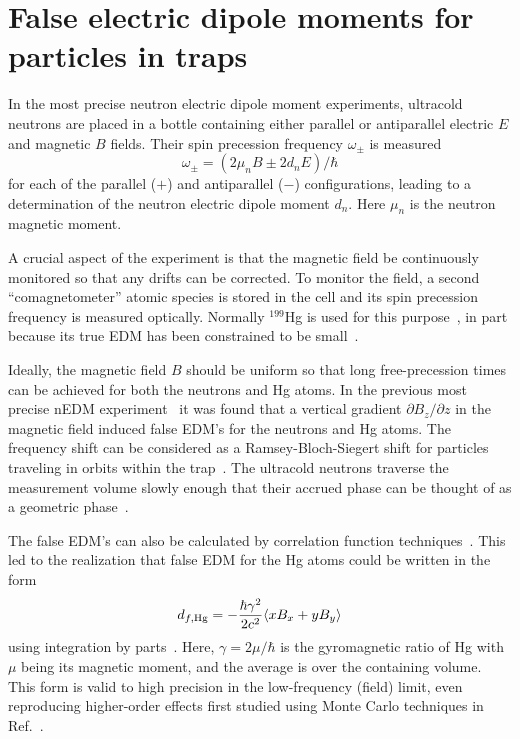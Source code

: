 \documentclass[preprint,12pt]{elsarticle}
\begin{document}

\section{False electric dipole moments for particles in traps}
\label{sec:intro}

In the most precise neutron electric dipole moment experiments,
ultracold neutrons are placed in a bottle containing either parallel
or antiparallel electric $E$ and magnetic $B$ fields.  Their spin
precession frequency $\omega_\pm$ is measured
\begin{equation}
\omega_\pm=(2\mu_nB\pm 2d_nE)/\hbar
\end{equation}
for each of the parallel ($+$) and antiparallel ($-$) configurations,
leading to a determination of the neutron electric dipole moment
$d_n$.  Here $\mu_n$ is the neutron magnetic moment.

A crucial aspect of the experiment is that the magnetic field be
continuously monitored so that any drifts can be corrected.  To
monitor the field, a second ``comagnetometer'' atomic species is
stored in the cell and its spin precession frequency is measured
optically.  Normally $^{199}$Hg is used for this
purpose~\cite{bib:green,bib:bakernim,bib:hg-better}, in part because
its true EDM has been constrained to be
small~\cite{bib:griffith,bib:hgupdate}.

Ideally, the magnetic field $B$ should be uniform so that long
free-precession times can be achieved for both the neutrons and Hg
atoms.  In the previous most precise nEDM
experiment~\cite{bib:baker,bib:pendlebury} it was found that a
vertical gradient $\partial B_z/\partial z$ in the magnetic field
induced false EDM's for the neutrons and Hg atoms.  The frequency
shift can be considered as a Ramsey-Bloch-Siegert shift for particles
traveling in orbits within the trap~\cite{bib:gpe1,bib:gpe2}.  The
ultracold neutrons traverse the measurement volume slowly enough that
their accrued phase can be thought of as a geometric
phase~\cite{bib:gpe1}.

The false EDM's can also be calculated by correlation function
techniques~\cite{bib:gpe3,bib:gpe4}.  This led to the realization that
false EDM for the Hg atoms could be written in the form
\begin{equation}
\label{eq:pignol}
  d_{f,\rm Hg}=-\frac{\hbar\gamma^{2}}{2c^{2}}\langle xB_x+yB_y\rangle
\end{equation}
using integration by parts~\cite{bib:pignol-roccia}.  Here, $\gamma=2\mu/\hbar$
is the gyromagnetic ratio of Hg with $\mu$ being its magnetic moment, and the average is over the
containing volume. This form is valid to high precision in the
low-frequency (field) limit, even reproducing higher-order effects
first studied using Monte Carlo techniques in Ref.~\cite{bib:gpe2}.
\end{document}
